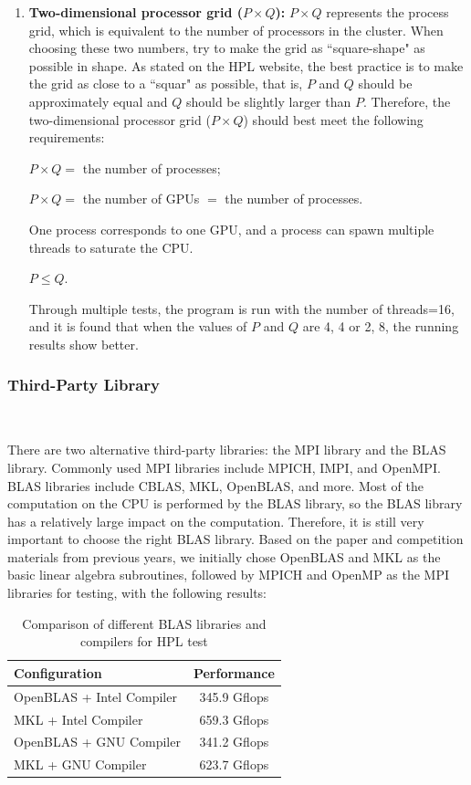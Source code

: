 \begin{enumerate}
    \item \textbf{Two-dimensional processor grid ($P\times Q$):} $P\times Q$ represents the process grid, which is equivalent to the number of processors in the cluster. 
    When choosing these two numbers, try to make the grid as ``square-shape" as possible in shape. 
    As stated on the HPL website, the best practice is to make the grid as close to a ``squar" as possible, that is, $P$ and $Q$ should be approximately equal and $Q$ should be slightly larger than $P$.
    Therefore, the two-dimensional processor grid ($P\times Q$) should best meet the following requirements:
    
   $P\times Q{=}$ the number of processes;
   
   $P\times Q{=}$ the number of GPUs ${=}$ the number of processes.

   One process corresponds to one GPU, and a process can spawn multiple threads to saturate the CPU.
   
   $P\leq Q$.
   
   Through multiple tests, the program is run with the number of threads=16, and it is found that when the values of $P$ and $Q$ are 4, 4 or 2, 8, the running results show better.
\end{enumerate}

\subsubsection{Third-Party Library}
\ 

There are two alternative third-party libraries: the MPI library and the BLAS library. 
Commonly used MPI libraries include MPICH, IMPI, and OpenMPI. BLAS libraries include CBLAS, MKL, OpenBLAS, and more. 
Most of the computation on the CPU is performed by the BLAS library, so the BLAS library has a relatively large impact on the computation. 
Therefore, it is still very important to choose the right BLAS library. 
Based on the paper and competition materials from previous years, we initially chose OpenBLAS and MKL as the basic linear algebra subroutines, followed by MPICH and OpenMP as the MPI libraries for testing, with the following results:

\begin{table}[htbp]
\centering
\caption{Comparison of different BLAS libraries and compilers for HPL test}
\label{tab:hplLib}
\begin{tabular}{|>{\raggedright\arraybackslash}p{5cm}|c|}
\hline
\rowcolor{lightgray}
\textbf{Configuration} & \textbf{Performance} \\
\hline
OpenBLAS + Intel Compiler & 345.9 Gflops \\
\hline
MKL + Intel Compiler & 659.3 Gflops \\
\hline
OpenBLAS + GNU Compiler & 341.2 Gflops \\
\hline
MKL + GNU Compiler & 623.7 Gflops \\
\hline
\end{tabular}
\end{table}

